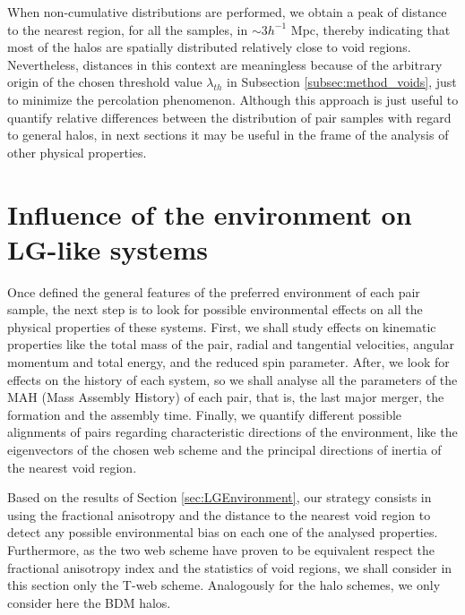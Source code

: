 \documentclass[a4,useAMS,usenatbib,usegraphicx]{latex/mn2e}
\begin{document}
When non-cumulative distributions are performed, we obtain a peak of 
distance to the nearest region, for all the samples, in $\sim 3 h^{-1}$ 
Mpc, thereby indicating that most of the halos are spatially distributed 
relatively close to void regions. Nevertheless, distances in this context 
are meaningless because of the arbitrary origin of the chosen threshold 
value $\lambda_{th}$ in Subsection \ref{subsec:method_voids}, just to 
minimize the percolation phenomenon. Although this approach is just useful 
to quantify relative differences between the distribution of pair samples 
with regard to general halos, in next sections it may be useful in the frame
of the analysis of other physical properties. 



\section{Influence of the environment on LG-like systems}
\label{sec:influence_environment_LG}



Once defined the general features of the preferred environment of each 
pair sample, the next step is to look for possible environmental effects 
on all the physical properties of these systems. First, we shall study 
effects on kinematic properties like the total mass of the pair, radial 
and tangential velocities, angular momentum and total energy, and the 
reduced spin parameter. After, we look for effects on the history of 
each system, so we shall analyse all the parameters of the MAH (Mass 
Assembly History) of each pair, that is, the last major merger, the 
formation and the assembly time. Finally, we quantify different possible 
alignments of pairs regarding characteristic directions of the environment, 
like the eigenvectors of the chosen web scheme and the principal 
directions of inertia of the nearest void region.



Based on the results of Section \ref{sec:LGEnvironment}, our strategy 
consists in using the fractional anisotropy and the distance to the 
nearest void region to detect any possible environmental bias on each
one of the analysed properties. Furthermore, as the two web scheme have
proven to be equivalent respect the fractional anisotropy index and the
statistics of void regions, we shall consider in this section only the 
T-web scheme. Analogously for the halo schemes, we only consider here the
BDM halos.
\end{document}
